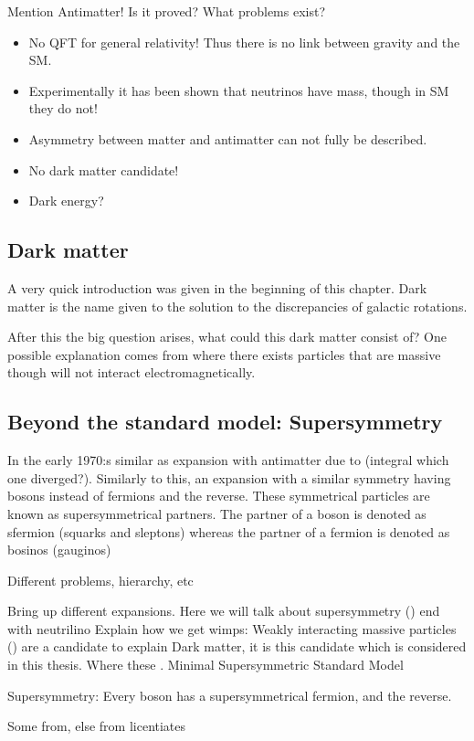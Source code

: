 Mention Antimatter!
Is it proved? What problems exist? 
\begin{itemize}
\item No QFT for general relativity! Thus there is no link between gravity and the SM.
\item Experimentally it has been shown that neutrinos have mass, though in SM they do not!
\item Asymmetry between matter and antimatter can not fully be described.
\item No dark matter candidate!
\item Dark energy?
\end{itemize} 
\subsection{Dark matter}\label{sec:dark}
A very quick introduction was given in the beginning of this chapter. Dark matter is the name given to the solution to the discrepancies of galactic rotations. 

After this the big question arises, what could this dark matter consist of? One possible explanation comes from \abbrSUSY where there exists particles that are massive though will not interact electromagnetically.

\subsection{Beyond the standard model: Supersymmetry}
In the early 1970:s similar as \abbrQED expansion with antimatter due to (integral which one diverged?). Similarly to this, an expansion with a similar symmetry having bosons instead of fermions and the reverse. These symmetrical particles are known as supersymmetrical partners. The \abbrSUSY partner of a boson is denoted as sfermion (squarks and sleptons) whereas the \abbrSUSY partner of a fermion is denoted as bosinos (gauginos)

Different problems, hierarchy, etc

Bring up different expansions. Here we will talk about supersymmetry (\abbrSUSY) end with neutrilino
Explain how we get wimps:
Weakly interacting massive particles (\abbrWIMPS) are a candidate to explain Dark matter, it is this candidate which is considered in this thesis. Where these 
\abbrWIMPS. 
Minimal Supersymmetric Standard Model

Supersymmetry: Every boson has a supersymmetrical fermion, and the reverse.

Some from, else from licentiates \citep{Martin:1998}

